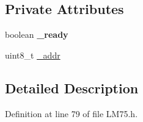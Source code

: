 \subsection*{Private Attributes}
\begin{DoxyCompactItemize}
\item 
\hypertarget{class_l_m75_a780e6eb930df3df71e23e44a5478fa1d}{boolean {\bfseries \-\_\-ready}}\label{class_l_m75_a780e6eb930df3df71e23e44a5478fa1d}

\item 
uint8\-\_\-t \hyperlink{class_l_m75_af76eee39ca511e2284988542f2fab1db}{\-\_\-addr}
\end{DoxyCompactItemize}


\subsection{Detailed Description}


Definition at line 79 of file L\-M75.\-h.



